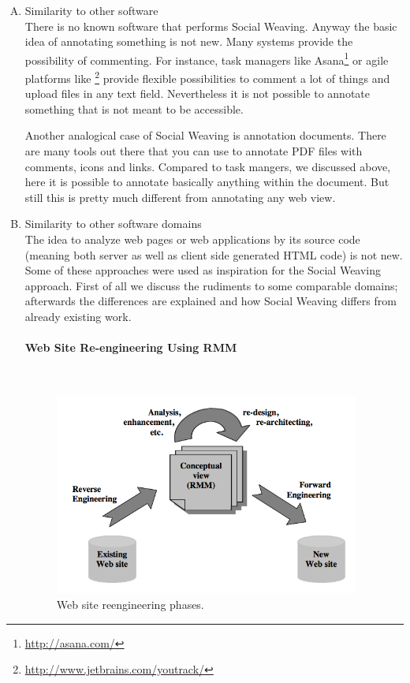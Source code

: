 \begin{enumerate}[A.]
\item Similarity to other software\\
There is no known software that performs Social Weaving. Anyway the basic idea of annotating something is not new. Many systems provide the possibility of commenting. For instance, task managers like Asana\footnote{\url{http://asana.com/}} or agile platforms like \footnote{\url{http://www.jetbrains.com/youtrack/}} provide flexible possibilities to comment a lot of things and upload files in any text field. Nevertheless it is not possible to annotate something that is not meant to be accessible. 

Another analogical case of Social Weaving is annotation documents. There are many tools out there that you can use to annotate PDF files with comments, icons and links. Compared to task mangers, we discussed above, here it is possible to annotate basically anything within the document. But still this is pretty much different from annotating any web view. 

\item Similarity to other software domains\\
The idea to analyze web pages or web applications by its source code (meaning both server as well as client side generated HTML code) is not new. Some of these approaches were used as inspiration for the Social Weaving approach. 
First of all we discuss the rudiments to some comparable domains; afterwards the differences are explained and how Social Weaving differs from already existing work.
	\paragraph{Web Site Re-engineering Using RMM}\mbox{}\\
	
	\begin{figure}\centering
			\includegraphics[width=10cm]{images/rmm-phases.png}
			\caption{Web site reengineering phases. \cite{antoniol2000web}}
			\label{rmm-phases}
	\end{figure} 
	

\end{enumerate}
